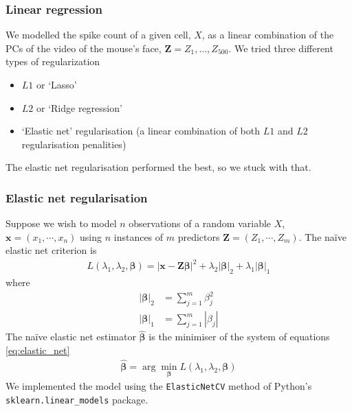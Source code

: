 \documentclass[a4paper,12pt]{article}
\theoremstyle{definition}
\begin{document}
        \subsubsection{Linear regression}
        We modelled the spike count of a given cell, $X$, as a linear combination of the PCs of the video of the mouse's face, $\mathbf{Z} = Z_1,\dots,Z_{500}$. We tried three different types of regularization 
        \begin{itemize}
            \item $L1$ or `Lasso'
            \item $L2$ or `Ridge regression'
            \item `Elastic net' regularisation (a linear combination of both $L1$ and $L2$ regularisation penalities)
        \end{itemize}
        The elastic net regularisation performed the best, so we stuck with that.

        \subsubsection{Elastic net regularisation}
        Suppose we wish to model $n$ observations of a random variable $X$, $\mathbf{x} = (x_1, \cdots, x_n)$ using $n$ instances of $m$ predictors $\mathbf{Z} = (Z_1, \cdots, Z_m)$. The na\"{i}ve elastic net criterion is
        \begin{align}\label{eq:elastic_net}
            L(\lambda_1, \lambda_2, \boldsymbol{\beta}) = | \mathbf{x} - \mathbf{Z} \boldsymbol{\beta} |^2 + \lambda_2 |\boldsymbol{\beta}|_2 + \lambda_1 |\boldsymbol{\beta}|_1
        \end{align}
        where
        \begin{align}
          |\boldsymbol{\beta}|_2 &= \sum_{j=1}^m \beta_j^2 \\
          |\boldsymbol{\beta}|_1 &= \sum_{j=1}^m |\beta_j|
        \end{align}
        The na\"{i}ve elastic net estimator $\hat{\boldsymbol{\beta}}$ is the minimiser of the system of equations \ref{eq:elastic_net} \cite{zou}
        \begin{align}
          \hat{\boldsymbol{\beta}} = \arg \min_{\boldsymbol{\beta}} L(\lambda_1, \lambda_2, \boldsymbol{\beta})
        \end{align}
        We implemented the model using the \texttt{ElasticNetCV} method of Python's \\ \texttt{sklearn.linear\_models} package.
\end{document}
